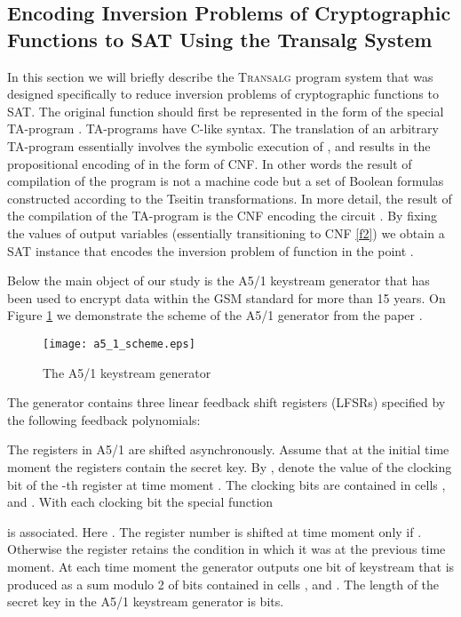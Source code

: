 \documentclass[runningheads,a4paper]{llncs}
\begin{document}
\subsection{Encoding Inversion Problems of Cryptographic Functions to SAT Using the \textbf{Transalg} System}

In this section we will briefly describe the \textsc{Transalg} program system \cite{DBLP:journals/corr/OtpuschennikovSK14} that was designed specifically to reduce inversion problems of cryptographic functions to SAT. The original function  should first be represented in the form of the special TA-program . TA-programs have C-like syntax. The translation of an arbitrary TA-program  essentially involves the symbolic execution of  \cite{King:1976:SEP:360248.360252}, and results in the propositional encoding of  in the form of CNF. In other words the result of compilation of the program  is not a machine code but a set of Boolean formulas constructed according to the Tseitin transformations. In more detail, the result of the compilation of the TA-program is the CNF  encoding the circuit . By fixing the values of output variables  (essentially transitioning to CNF \eqref{f2}) we obtain a SAT instance that encodes the inversion problem of function  in the point .

Below the main object of our study is the A5/1 keystream generator that has been used to encrypt data within the GSM standard for more than 15 years.
On Figure \ref{a5_1_scheme} we demonstrate the scheme of the A5/1 generator from the paper \cite{DBLP:conf/fse/BiryukovSW00}. 

\begin{figure}[ht]
	\centering
		\texttt{[image: a5\_1\_scheme.eps]}
	\caption{The A5/1 keystream generator}
	\label{a5_1_scheme}
\end{figure}

The generator contains three linear feedback shift registers (LFSRs) specified by the following feedback polynomials:


The registers in A5/1 are shifted asynchronously. Assume that at the initial time moment  the registers contain the secret key. By ,  denote the value of the clocking bit of the -th register at time moment . The clocking bits are contained in cells ,  and . With each clocking bit the special function

is associated. Here . The register number  is shifted at time moment  only if . Otherwise the register retains the condition in which it was at the previous time moment. At each time moment the generator outputs one bit of keystream that is produced as a sum modulo 2 of bits contained in cells ,  and . The length of the secret key in the A5/1 keystream generator is  bits.
\end{document}
